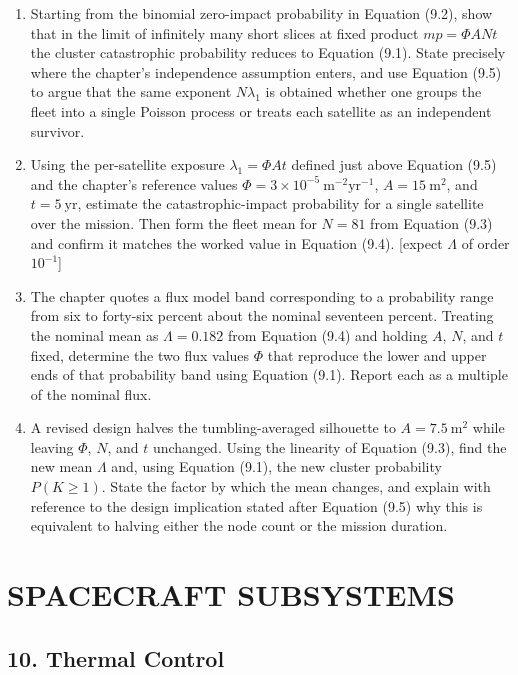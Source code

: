 \documentclass[
  11pt,
  openany,
  oneside]{book}
\begin{document}
\begin{enumerate}
\def\labelenumi{\arabic{enumi}.}
\item
  Starting from the binomial zero-impact probability in Equation (9.2),
  show that in the limit of infinitely many short slices at fixed
  product \(mp = \Phi A N t\) the cluster catastrophic probability
  reduces to Equation (9.1). State precisely where the chapter's
  independence assumption enters, and use Equation (9.5) to argue that
  the same exponent \(N\lambda_1\) is obtained whether one groups the
  fleet into a single Poisson process or treats each satellite as an
  independent survivor.
\item
  Using the per-satellite exposure \(\lambda_1 = \Phi A t\) defined just
  above Equation (9.5) and the chapter's reference values
  \(\Phi = 3\times10^{-5}\ \mathrm{m^{-2}yr^{-1}}\),
  \(A = 15\ \mathrm{m^2}\), and \(t = 5\ \mathrm{yr}\), estimate the
  catastrophic-impact probability for a single satellite over the
  mission. Then form the fleet mean for \(N = 81\) from Equation (9.3)
  and confirm it matches the worked value in Equation (9.4). {[}expect
  \(\Lambda\) of order \(10^{-1}\){]}
\item
  The chapter quotes a flux model band corresponding to a probability
  range from six to forty-six percent about the nominal seventeen
  percent. Treating the nominal mean as \(\Lambda = 0.182\) from
  Equation (9.4) and holding \(A\), \(N\), and \(t\) fixed, determine
  the two flux values \(\Phi\) that reproduce the lower and upper ends
  of that probability band using Equation (9.1). Report each as a
  multiple of the nominal flux.
\item
  A revised design halves the tumbling-averaged silhouette to
  \(A = 7.5\ \mathrm{m^2}\) while leaving \(\Phi\), \(N\), and \(t\)
  unchanged. Using the linearity of Equation (9.3), find the new mean
  \(\Lambda\) and, using Equation (9.1), the new cluster probability
  \(P(K\ge 1)\). State the factor by which the mean changes, and explain
  with reference to the design implication stated after Equation (9.5)
  why this is equivalent to halving either the node count or the mission
  duration.
\end{enumerate}

\part{SPACECRAFT SUBSYSTEMS}\label{spacecraft-subsystems}

\chapter{10. Thermal Control}\label{thermal-control}
\end{document}
